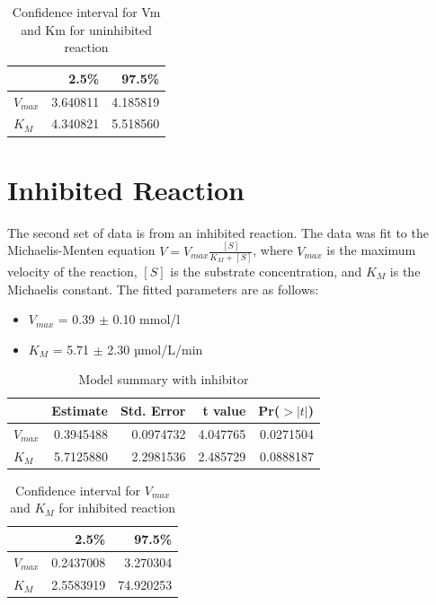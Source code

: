 \documentclass{article}
\begin{document}
\begin{table}[H]

    \caption{Confidence interval for Vm and Km for uninhibited reaction}
    \centering
    \begin{tabular}[t]{l|r|r}
        \hline
                  & 2.5\%    & 97.5\%   \\
        \hline
        $V_{max}$ & 3.640811 & 4.185819 \\
        \hline
        $K_{M}$   & 4.340821 & 5.518560 \\
        \hline
    \end{tabular}
\end{table}

\section{Inhibited Reaction}

The second set of data is from an inhibited reaction. The data was fit to the Michaelis-Menten 
equation $V = V_{max}\displaystyle \frac{[S]}{K_{M} + [S]}$, where $V_{max}$ is the maximum velocity of the 
reaction, $[S]$ is the substrate concentration, and $K_{M}$ is the Michaelis constant. The 
fitted parameters are as follows:
\begin{itemize}
\item $V_{max}$ = 0.39 $\pm$ 0.10 mmol/l
\item $K_{M}$ = 5.71 $\pm$ 2.30 µmol/L/min
\end{itemize}

\begin{table}[H]

\caption{Model summary with inhibitor}
\centering
\begin{tabular}[t]{l|r|r|r|r}
\hline
& Estimate & Std. Error & t value & Pr($>|t|$)\\
\hline
$V_{max}$ & 0.3945488 & 0.0974732 & 4.047765 & 0.0271504\\
\hline
$K_{M}$ & 5.7125880 & 2.2981536 & 2.485729 & 0.0888187\\
\hline
\end{tabular}
\end{table}

\begin{table}[H]

\caption{Confidence interval for $V_{max}$ and $K_{M}$ for inhibited reaction}
\centering
\begin{tabular}[t]{l|r|r}
\hline
  & 2.5\% & 97.5\%\\
\hline
$V_{max}$ & 0.2437008 & 3.270304\\
\hline
$K_{M}$ & 2.5583919 & 74.920253\\
\hline
\end{tabular}
\end{table}
\end{document}
